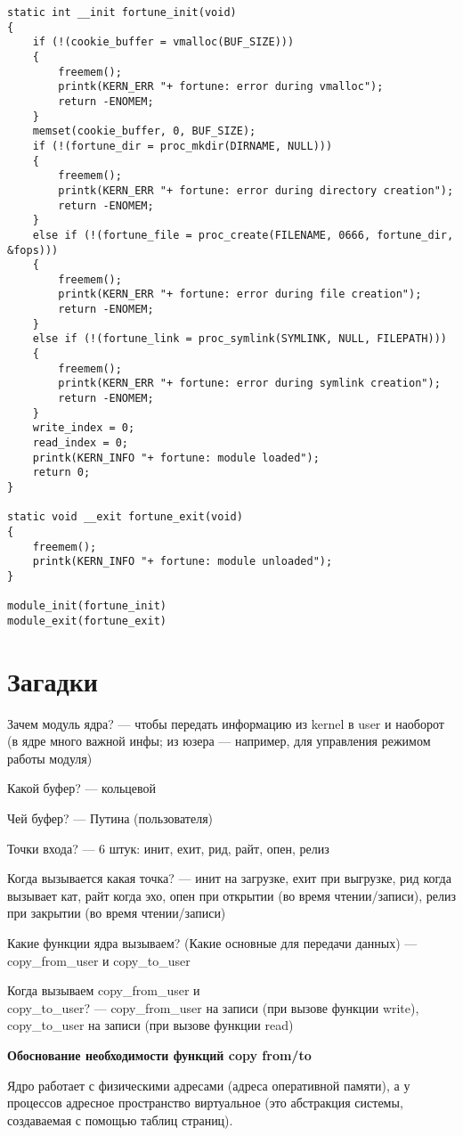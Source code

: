 \begin{lstlisting}
static int __init fortune_init(void) 
{
	if (!(cookie_buffer = vmalloc(BUF_SIZE))) 
	{
		freemem();
		printk(KERN_ERR "+ fortune: error during vmalloc");
		return -ENOMEM;
	}
	memset(cookie_buffer, 0, BUF_SIZE);
	if (!(fortune_dir = proc_mkdir(DIRNAME, NULL))) 
	{
		freemem();
		printk(KERN_ERR "+ fortune: error during directory creation");
		return -ENOMEM;
	} 
	else if (!(fortune_file = proc_create(FILENAME, 0666, fortune_dir, &fops))) 
	{
		freemem();
		printk(KERN_ERR "+ fortune: error during file creation");
		return -ENOMEM;
	} 
	else if (!(fortune_link = proc_symlink(SYMLINK, NULL, FILEPATH))) 
	{
		freemem();
		printk(KERN_ERR "+ fortune: error during symlink creation");
		return -ENOMEM;
	}
	write_index = 0;
	read_index = 0;
	printk(KERN_INFO "+ fortune: module loaded");
	return 0;
}

static void __exit fortune_exit(void) 
{
	freemem();
	printk(KERN_INFO "+ fortune: module unloaded");
}

module_init(fortune_init) 
module_exit(fortune_exit)
\end{lstlisting}

\section*{Загадки}

Зачем модуль ядра? --- чтобы передать информацию из kernel в user и наоборот (в ядре много важной инфы; из юзера --- например, для управления режимом работы модуля)

Какой буфер? --- кольцевой

Чей буфер? --- Путина (пользователя)

Точки входа? --- 6 штук: инит, ехит, рид, райт, опен, релиз

Когда вызывается какая точка? --- инит на загрузке, ехит при выгрузке, рид когда вызывает кат, райт когда эхо, опен при открытии (во время чтении/записи), релиз при закрытии (во время чтении/записи)

Какие функции ядра вызываем? (Какие основные для передачи данных) --- copy\_from\_user и copy\_to\_user

Когда вызываем copy\_from\_user и \\ copy\_to\_user? --- copy\_from\_user на записи (при вызове функции write), \\ copy\_to\_user на записи (при вызове функции read)

\textbf{Обоснование необходимости функций copy from/to}

Ядро работает с физическими адресами (адреса оперативной памяти), а у процессов адресное пространство виртуальное (это абстракция системы, создаваемая с помощью таблиц страниц).

